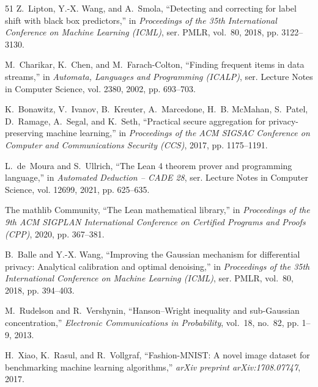 \documentclass[journal]{IEEEtran}
\theoremstyle{definition}
\begin{document}
\begin{thebibliography}{51}
Z.~Lipton, Y.-X. Wang, and A.~Smola, ``Detecting and correcting for label shift
  with black box predictors,'' in \emph{Proceedings of the 35th International
  Conference on Machine Learning (ICML)}, ser. PMLR, vol.~80, 2018, pp.
  3122--3130.

M.~Charikar, K.~Chen, and M.~Farach-Colton, ``Finding frequent items in data
  streams,'' in \emph{Automata, Languages and Programming (ICALP)}, ser.
  Lecture Notes in Computer Science, vol. 2380, 2002, pp. 693--703.

K.~Bonawitz, V.~Ivanov, B.~Kreuter, A.~Marcedone, H.~B. McMahan, S.~Patel,
  D.~Ramage, A.~Segal, and K.~Seth, ``Practical secure aggregation for
  privacy-preserving machine learning,'' in \emph{Proceedings of the ACM SIGSAC
  Conference on Computer and Communications Security (CCS)}, 2017, pp.
  1175--1191.

L.~de~Moura and S.~Ullrich, ``The {L}ean 4 theorem prover and programming
  language,'' in \emph{Automated Deduction -- CADE 28}, ser. Lecture Notes in
  Computer Science, vol. 12699, 2021, pp. 625--635.

{The mathlib Community}, ``The {L}ean mathematical library,'' in
  \emph{Proceedings of the 9th ACM SIGPLAN International Conference on
  Certified Programs and Proofs (CPP)}, 2020, pp. 367--381.

B.~Balle and Y.-X. Wang, ``Improving the {G}aussian mechanism for differential
  privacy: Analytical calibration and optimal denoising,'' in \emph{Proceedings
  of the 35th International Conference on Machine Learning (ICML)}, ser. PMLR,
  vol.~80, 2018, pp. 394--403.

M.~Rudelson and R.~Vershynin, ``{H}anson--{W}right inequality and
  sub-{G}aussian concentration,'' \emph{Electronic Communications in
  Probability}, vol.~18, no.~82, pp. 1--9, 2013.

H.~Xiao, K.~Rasul, and R.~Vollgraf, ``{Fashion-MNIST}: A novel image dataset
  for benchmarking machine learning algorithms,'' \emph{arXiv preprint
  arXiv:1708.07747}, 2017.


\end{thebibliography}
\end{document}
